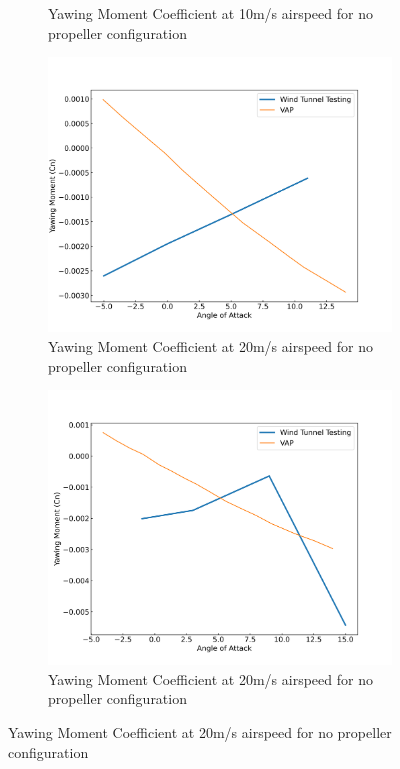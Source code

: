 \begin{figure}[H]
\begin{subfigure}[b]{0.467\textwidth}
        \caption{Yawing Moment Coefficient at 10m/s airspeed for no propeller configuration}
        \label{fig:VAP_noProp_Cn_10ms_11000}
    \end{subfigure}
    \begin{subfigure}[b]{0.467\textwidth}
        \centering
        \includegraphics[width=\textwidth]{05_Results/VAP/noProp/Cn/20ms_6000RPM_Cn.png}
        \caption{Yawing Moment Coefficient at 20m/s airspeed for no propeller configuration}
        \label{fig:VAP_noProp_Cn_20ms_6000}
    \end{subfigure}
    \begin{subfigure}[b]{0.467\textwidth}
        \centering
        \includegraphics[width=\textwidth]{05_Results/VAP/noProp/Cn/20ms_11000RPM_Cn.png}
        \caption{Yawing Moment Coefficient at 20m/s airspeed for no propeller configuration}
        \label{fig:VAP_noProp_Cn_20ms_11000}
    \end{subfigure}
\end{figure}



